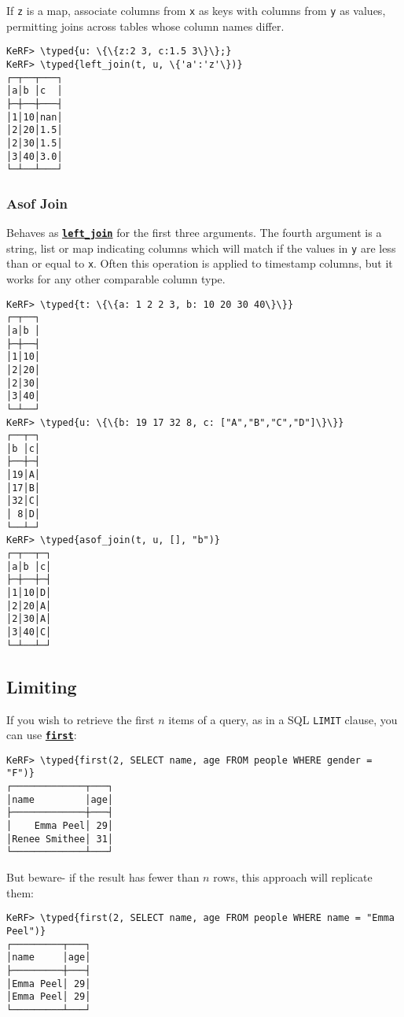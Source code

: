 \documentclass{article}
\newcommand{\typed}[1]{\textcolor{TealBlue}{#1}}
\newcommand{\primu}[2]{\hyperref[prim:#2]{\textbf{\texttt{#1}}}}
\newcommand{\prim}[1]{\primu{#1}{#1}}
\begin{document}
\pagebreak
If \texttt{z} is a map, associate columns from \texttt{x} as keys with columns from \texttt{y} as values, permitting joins across tables whose column names differ.
\begin{Verbatim}
KeRF> \typed{u: \{\{z:2 3, c:1.5 3\}\};}
KeRF> \typed{left_join(t, u, \{'a':'z'\})}
┌─┬──┬───┐
│a│b │c  │
├─┼──┼───┤
│1│10│nan│
│2│20│1.5│
│2│30│1.5│
│3│40│3.0│
└─┴──┴───┘
\end{Verbatim}

\subsubsection{Asof Join}

Behaves as \primu{left\_join}{leftJoin} for the first three arguments. The fourth argument is a string, list or map indicating columns which will match if the values in \texttt{y} are less than or equal to \texttt{x}. Often this operation is applied to timestamp columns, but it works for any other comparable column type.

\begin{Verbatim}
KeRF> \typed{t: \{\{a: 1 2 2 3, b: 10 20 30 40\}\}}
┌─┬──┐
│a│b │
├─┼──┤
│1│10│
│2│20│
│2│30│
│3│40│
└─┴──┘
KeRF> \typed{u: \{\{b: 19 17 32 8, c: ["A","B","C","D"]\}\}}
┌──┬─┐
│b │c│
├──┼─┤
│19│A│
│17│B│
│32│C│
│ 8│D│
└──┴─┘
KeRF> \typed{asof_join(t, u, [], "b")}
┌─┬──┬─┐
│a│b │c│
├─┼──┼─┤
│1│10│D│
│2│20│A│
│2│30│A│
│3│40│C│
└─┴──┴─┘
\end{Verbatim}

\pagebreak
\subsection{Limiting}
If you wish to retrieve the first $n$ items of a query, as in a SQL \texttt{LIMIT} clause, you can use \prim{first}:
\begin{Verbatim}
KeRF> \typed{first(2, SELECT name, age FROM people WHERE gender = "F")}
┌─────────────┬───┐
│name         │age│
├─────────────┼───┤
│    Emma Peel│ 29│
│Renee Smithee│ 31│
└─────────────┴───┘
\end{Verbatim}

But beware- if the result has fewer than $n$ rows, this approach will replicate them:
\begin{Verbatim}
KeRF> \typed{first(2, SELECT name, age FROM people WHERE name = "Emma Peel")}
┌─────────┬───┐
│name     │age│
├─────────┼───┤
│Emma Peel│ 29│
│Emma Peel│ 29│
└─────────┴───┘
\end{Verbatim}
\end{document}
